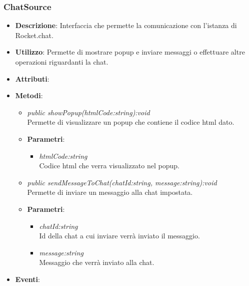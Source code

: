 \subsubsection{ChatSource}
\begin{itemize}
\item \textbf{Descrizione}: Interfaccia che permette la comunicazione con l'istanza di Rocket.chat.
\item \textbf{Utilizzo}: Permette di mostrare popup e inviare messaggi o effettuare altre operazioni riguardanti la chat.
\item \textbf{Attributi}: 
\item \textbf{Metodi}:
	\begin{itemize}
	\item \textit{public showPopup(htmlCode:string):void}\\
	Permette di visualizzare un popup che contiene il codice html dato.
			\item{\textbf{Parametri}: \begin{itemize}
			\item \textit{htmlCode:string}\\
				Codice html che verra visualizzato nel popup.
			\end{itemize}}
			\item \textit{public sendMessageToChat(chatId:string, message:string):void}\\
			Permette di inviare un messaggio alla chat impostata.
					\item{\textbf{Parametri}: \begin{itemize}
\item \textit{chatId:string}\\
	Id della chat a cui inviare verrà inviato il messaggio.
\item \textit{message:string}\\
	Messaggio che verrà inviato alla chat.
\end{itemize}}
	\end{itemize}
\item \textbf{Eventi}:
\end{itemize}